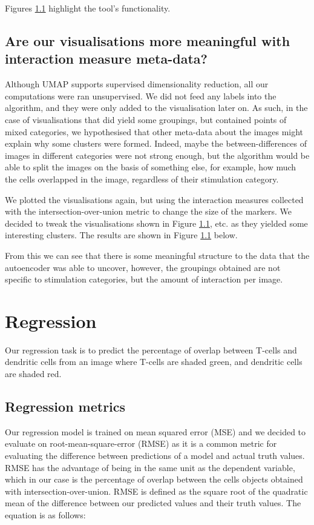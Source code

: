 Figures \ref{} highlight the tool's functionality.

\subsection{Are our visualisations more meaningful with interaction measure meta-data?}

Although UMAP supports supervised dimensionality reduction, all our computations were ran unsupervised. We did not feed any labels into the algorithm, and they were only added to the visualisation later on. As such, in the case of visualisations that did yield some groupings, but contained points of mixed categories, we hypothesised that other meta-data about the images might explain why some clusters were formed. Indeed, maybe the between-differences of images in different categories were not strong enough, but the algorithm would be able to split the images on the basis of something else, for example, how much the cells overlapped in the image, regardless of their stimulation category.

We plotted the visualisations again, but using the interaction measures collected with the intersection-over-union metric to change the size of the markers. We decided to tweak the visualisations shown in Figure \ref{}, etc. as they yielded some interesting clusters. The results are shown in Figure \ref{} below.

From this we can see that there is some meaningful structure to the data that the autoencoder was able to uncover, however, the groupings obtained are not specific to stimulation categories, but the amount of interaction per image.

\section{Regression}

Our regression task is to predict the percentage of overlap between T-cells and dendritic cells from an image where T-cells are shaded green, and dendritic cells are shaded red.

\subsection{Regression metrics}

Our regression model is trained on mean squared error (MSE) and we decided to evaluate on root-mean-square-error (RMSE) as it is a common metric for evaluating the difference between predictions of a model and actual truth values. RMSE has the advantage of being in the same unit as the dependent variable, which in our case is the percentage of overlap between the cells objects obtained with intersection-over-union. RMSE is defined as the square root of the quadratic mean of the difference between our predicted values and their truth values. The equation is as follows:

